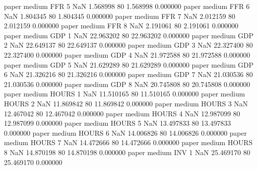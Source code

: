             paper     medium      FFR                 5                  NaN  1.568998 80       1.568998           0.000000
            paper     medium      FFR                 6                  NaN  1.804345 80       1.804345           0.000000
            paper     medium      FFR                 7                  NaN  2.012159 80       2.012159           0.000000
            paper     medium      FFR                 8                  NaN  2.191061 80       2.191061           0.000000
            paper     medium      GDP                 1                  NaN 22.963202 80      22.963202           0.000000
            paper     medium      GDP                 2                  NaN 22.649137 80      22.649137           0.000000
            paper     medium      GDP                 3                  NaN 22.327400 80      22.327400           0.000000
            paper     medium      GDP                 4                  NaN 21.972588 80      21.972588           0.000000
            paper     medium      GDP                 5                  NaN 21.629289 80      21.629289           0.000000
            paper     medium      GDP                 6                  NaN 21.326216 80      21.326216           0.000000
            paper     medium      GDP                 7                  NaN 21.030536 80      21.030536           0.000000
            paper     medium      GDP                 8                  NaN 20.745808 80      20.745808           0.000000
            paper     medium    HOURS                 1                  NaN 11.510165 80      11.510165           0.000000
            paper     medium    HOURS                 2                  NaN 11.869842 80      11.869842           0.000000
            paper     medium    HOURS                 3                  NaN 12.467042 80      12.467042           0.000000
            paper     medium    HOURS                 4                  NaN 12.987099 80      12.987099           0.000000
            paper     medium    HOURS                 5                  NaN 13.497833 80      13.497833           0.000000
            paper     medium    HOURS                 6                  NaN 14.006826 80      14.006826           0.000000
            paper     medium    HOURS                 7                  NaN 14.472666 80      14.472666           0.000000
            paper     medium    HOURS                 8                  NaN 14.870198 80      14.870198           0.000000
            paper     medium      INV                 1                  NaN 25.469170 80      25.469170           0.000000
